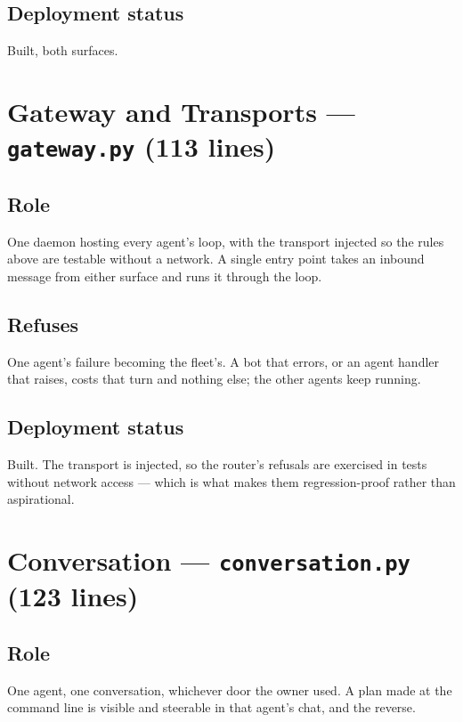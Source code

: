 \documentclass[11pt]{article}
\newcommand{\code}[1]{\texttt{\small #1}}
\begin{document}
\subsection{Deployment status}

Built, both surfaces.

\section{Gateway and Transports --- \code{gateway.py} (113 lines)}
\label{sec:gateway}

\subsection{Role}

One daemon hosting every agent's loop, with the transport injected so the rules above are testable without a network. A single entry point takes an inbound message from either surface and runs it through the loop.

\subsection{Refuses}

One agent's failure becoming the fleet's. A bot that errors, or an agent handler that raises, costs that turn and nothing else; the other agents keep running.

\subsection{Deployment status}

Built. The transport is injected, so the router's refusals are exercised in tests without network access --- which is what makes them regression-proof rather than aspirational.

\section{Conversation --- \code{conversation.py} (123 lines)}
\label{sec:conversation}

\subsection{Role}

One agent, one conversation, whichever door the owner used. A plan made at the command line is visible and steerable in that agent's chat, and the reverse.
\end{document}
